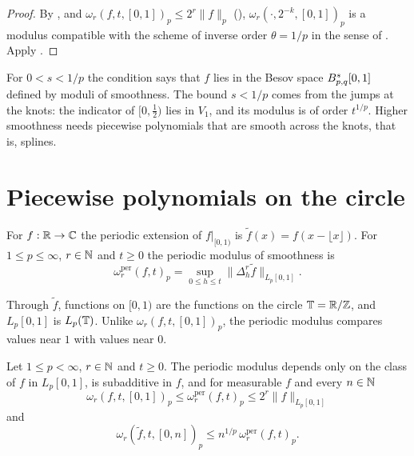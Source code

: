 \begin{proof}
\leanok
By ,  and $\omega_r(f, t, [0,1])_p \leq 2^r \|f\|_p$
(), $\omega_r(\cdot, 2^{-k}, [0,1])_p$ is a modulus compatible with
the scheme of inverse order $\theta = 1/p$ in the sense of . Apply
.
\end{proof}

For $0 < s < 1/p$ the condition says that $f$ lies in the Besov space $B^{s}_{p,q}[0,1]$
defined by moduli of smoothness. The bound $s < 1/p$ comes from the jumps at the knots: the
indicator of $[0, \tfrac12)$ lies in $V_1$, and its modulus is of order $t^{1/p}$. Higher
smoothness needs piecewise polynomials that are smooth across the knots, that is, splines.

\section{Piecewise polynomials on the circle}

\begin{definition}
\label{def:per-modulus}
\leanok
{}
For $f : \mathbb{R} \to \mathbb{C}$ the periodic extension of $f|_{[0,1)}$ is
$\tilde f(x) = f(x - \lfloor x \rfloor)$. For $1 \leq p \leq \infty$, $r \in \mathbb{N}$ and $t \geq 0$
the periodic modulus of smoothness is
\[
  \omega_r^{\mathrm{per}}(f, t)_p = \sup_{0 \leq h \leq t} \|\Delta_h^r \tilde f\|_{L_p[0,1]} .
\]
\end{definition}

Through $\tilde f$, functions on $[0, 1)$ are the functions on the circle $\mathbb{T} = \mathbb{R} / \mathbb{Z}$, and
$L_p[0,1]$ is $L_p(\mathbb{T})$. Unlike $\omega_r(f, t, [0,1])_p$, the periodic modulus compares values
near $1$ with values near $0$.

\begin{lemma}
\label{lem:per-modulus}
\leanok
{}
Let $1 \leq p < \infty$, $r \in \mathbb{N}$ and $t \geq 0$. The periodic modulus depends only on the class
of $f$ in $L_p[0,1]$, is subadditive in $f$, and for measurable $f$ and every $n \in \mathbb{N}$
\[
  \omega_r(f, t, [0,1])_p \leq \omega_r^{\mathrm{per}}(f, t)_p \leq 2^r \|f\|_{L_p[0,1]}
\]
and
\[
  \omega_r(\tilde f, t, [0, n])_p \leq n^{1/p} \, \omega_r^{\mathrm{per}}(f, t)_p .
\]
\end{lemma}

